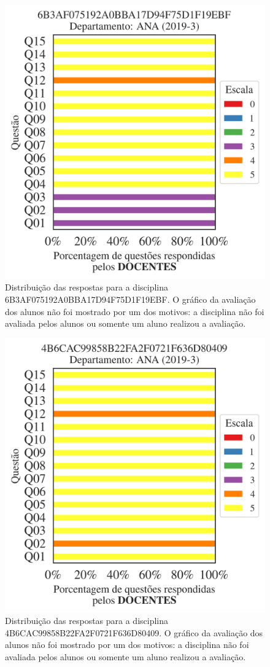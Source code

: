 \documentclass[a4paper,10pt]{article}
\begin{document}
\begin{figure}[h]
\centering
\includegraphics[width=0.485\linewidth]{analise_disciplina_departamento_ANA_6B3AF075192A0BBA17D94F75D1F19EBF_docentes.png}
\caption{\label{fig:analise_geral_departamento}                Distribuição das respostas para a disciplina 6B3AF075192A0BBA17D94F75D1F19EBF. O gráfico da avaliação dos alunos não foi mostrado  por um dos motivos:  a disciplina não foi avaliada pelos alunos ou somente um aluno realizou a avaliação. }
\end{figure}
\begin{figure}[h]
\centering
\includegraphics[width=0.485\linewidth]{analise_disciplina_departamento_ANA_4B6CAC99858B22FA2F0721F636D80409_docentes.png}
\caption{\label{fig:analise_geral_departamento}                Distribuição das respostas para a disciplina 4B6CAC99858B22FA2F0721F636D80409. O gráfico da avaliação dos alunos não foi mostrado  por um dos motivos:  a disciplina não foi avaliada pelos alunos ou somente um aluno realizou a avaliação. }
\end{figure}
\end{document}
